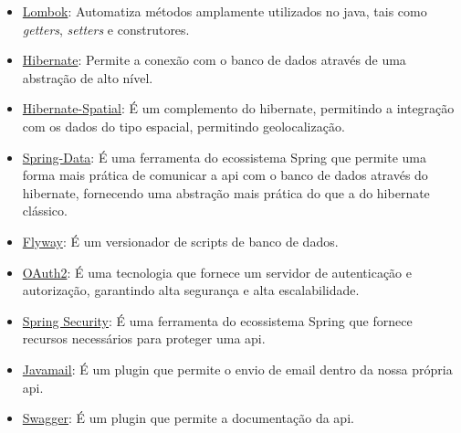 \begin{itemize}

	\item \underline{Lombok}: Automatiza métodos amplamente utilizados no java, tais como \textit{getters}, \textit{setters} e construtores.

	\item \underline{Hibernate}: Permite a conexão com o banco de dados através de uma abstração de alto nível.	
	
	\item \underline{Hibernate-Spatial}: É um complemento do hibernate, permitindo a integração com os dados do tipo espacial, permitindo geolocalização.
	
	\item \underline{Spring-Data}: É uma ferramenta do ecossistema Spring que permite uma forma mais prática de comunicar a api com o banco de dados através do hibernate, fornecendo uma abstração mais prática do que a do hibernate clássico.
	
	\item \underline{Flyway}: É um versionador de scripts de banco de dados.
	
	\item \underline{OAuth2}: É uma tecnologia que fornece um servidor de autenticação e autorização, garantindo alta segurança e alta escalabilidade.
	
	\item \underline{Spring Security}: É uma ferramenta do ecossistema Spring que fornece recursos necessários para proteger uma api.
	
	\item \underline{Javamail}: É um plugin que permite o envio de email dentro da nossa própria api.
	
	\item \underline{Swagger}: É um plugin que permite a documentação da api.
	
\end{itemize}

